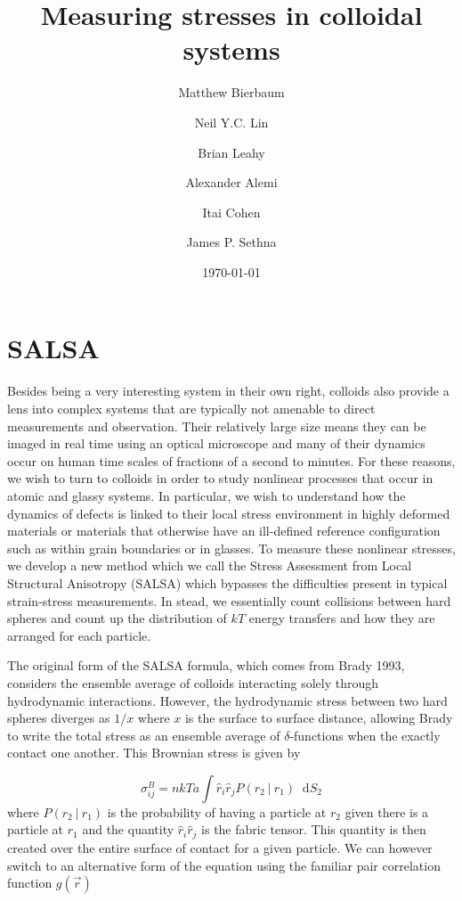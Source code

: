 \documentclass[twocolumn,amsmath,amssymb]{revtex4}
\newcommand\given[1][]{\:#1\vert\:}
\newcommand*\diff{\mathop{}\!\mathrm{d}}
\begin{document}
\title{Measuring stresses in colloidal systems}
\author{Matthew Bierbaum}
\author{Neil Y.C. Lin}
\author{Brian Leahy}
\author{Alexander Alemi}
\author{Itai Cohen}
\author{James P. Sethna}

\date{\today}

\maketitle

\section{SALSA}

Besides being a very interesting system in their own right, colloids also
provide a lens into complex systems that are typically not amenable to direct
measurements and observation.  Their relatively large size means they can be
imaged in real time using an optical microscope and many of their
dynamics occur on human time scales of fractions of a second to minutes.  For these
reasons, we wish to turn to colloids in order to study nonlinear processes that
occur in atomic and glassy systems.  In particular, we wish to understand how
the dynamics of defects is linked to their local stress environment in highly
deformed materials or materials that otherwise have an ill-defined reference
configuration such as within grain boundaries or in glasses.  To measure these
nonlinear stresses, we develop a new method which we call the Stress Assessment
from Local Structural Anisotropy (SALSA) which bypasses the difficulties
present in typical strain-stress measurements.  In stead, we essentially count
collisions between hard spheres and count up the distribution of $kT$ energy
transfers and how they are arranged for each particle.

The original form of the SALSA formula, which comes from Brady 1993, considers
the ensemble average of colloids interacting solely through hydrodynamic interactions.
However, the hydrodynamic stress between two hard spheres diverges as $1/x$
where $x$ is the surface to surface distance, allowing Brady to write the
total stress as an ensemble average of $\delta$-functions when the exactly
contact one another.  This Brownian stress is given by

\begin{equation}
    \sigma^{B}_{ij} = nkTa \int \hat{r}_i \hat{r}_j P(r_2\given  r_1) \diff S_2
\end{equation}
where $P(r_2 \given r_1)$ is the probability of having a particle at $r_2$
given there is a particle at $r_1$ and the quantity $\hat{r}_i\hat{r}_j$ is the
fabric tensor.  This quantity is then created over the entire surface of
contact for a given particle. We can however switch to an alternative form of
the equation using the familiar pair correlation function $g(\vec{r})$
\end{document}
